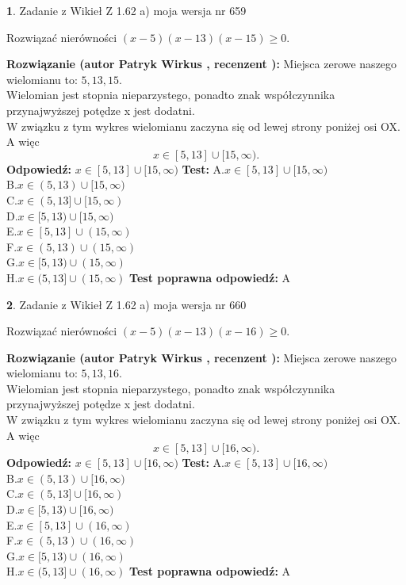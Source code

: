 \documentclass[12pt, a4paper]{article}
\theoremstyle{definition} %
\newtheorem{zad}{}
\newcommand{\zadStart}[1]{\begin{zad}#1\newline}
\newcommand{\zadStop}{\end{zad}}
\newcommand{\rozwStart}[2]{\noindent \textbf{Rozwiązanie (autor #1 , recenzent #2): }\newline}
\newcommand{\rozwStop}{\newline}
\newcommand{\odpStart}{\noindent \textbf{Odpowiedź:}\newline}
\newcommand{\odpStop}{\newline}
\newcommand{\testStart}{\noindent \textbf{Test:}\newline}
\newcommand{\testStop}{\newline}
\newcommand{\kluczStart}{\noindent \textbf{Test poprawna odpowiedź:}\newline}
\newcommand{\kluczStop}{\newline}
\begin{document}
\zadStart{Zadanie z Wikieł Z 1.62 a) moja wersja nr 659}

Rozwiązać nierówności $(x-5)(x-13)(x-15)\ge0$.
\zadStop
\rozwStart{Patryk Wirkus}{}
Miejsca zerowe naszego wielomianu to: $5, 13, 15$.\\
Wielomian jest stopnia nieparzystego, ponadto znak współczynnika przy\linebreak najwyższej potędze x jest dodatni.\\ W związku z tym wykres wielomianu zaczyna się od lewej strony poniżej osi OX. A więc $$x \in [5,13] \cup [15,\infty).$$
\rozwStop
\odpStart
$x \in [5,13] \cup [15,\infty)$
\odpStop
\testStart
A.$x \in [5,13] \cup [15,\infty)$\\
B.$x \in (5,13) \cup [15,\infty)$\\
C.$x \in (5,13] \cup [15,\infty)$\\
D.$x \in [5,13) \cup [15,\infty)$\\
E.$x \in [5,13] \cup (15,\infty)$\\
F.$x \in (5,13) \cup (15,\infty)$\\
G.$x \in [5,13) \cup (15,\infty)$\\
H.$x \in (5,13] \cup (15,\infty)$
\testStop
\kluczStart
A
\kluczStop



\zadStart{Zadanie z Wikieł Z 1.62 a) moja wersja nr 660}

Rozwiązać nierówności $(x-5)(x-13)(x-16)\ge0$.
\zadStop
\rozwStart{Patryk Wirkus}{}
Miejsca zerowe naszego wielomianu to: $5, 13, 16$.\\
Wielomian jest stopnia nieparzystego, ponadto znak współczynnika przy\linebreak najwyższej potędze x jest dodatni.\\ W związku z tym wykres wielomianu zaczyna się od lewej strony poniżej osi OX. A więc $$x \in [5,13] \cup [16,\infty).$$
\rozwStop
\odpStart
$x \in [5,13] \cup [16,\infty)$
\odpStop
\testStart
A.$x \in [5,13] \cup [16,\infty)$\\
B.$x \in (5,13) \cup [16,\infty)$\\
C.$x \in (5,13] \cup [16,\infty)$\\
D.$x \in [5,13) \cup [16,\infty)$\\
E.$x \in [5,13] \cup (16,\infty)$\\
F.$x \in (5,13) \cup (16,\infty)$\\
G.$x \in [5,13) \cup (16,\infty)$\\
H.$x \in (5,13] \cup (16,\infty)$
\testStop
\kluczStart
A
\kluczStop
\end{document}
